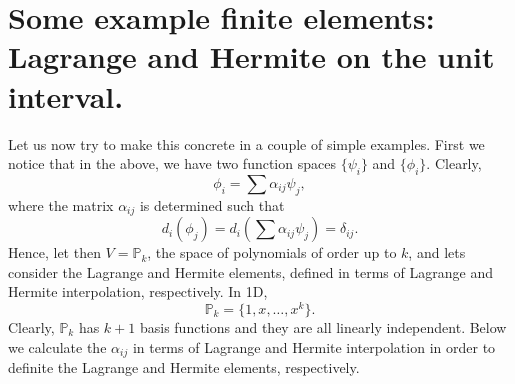 \section{Some example finite elements: Lagrange and Hermite on the unit interval. }
Let us now try to make this concrete in a couple of simple examples. First we notice that  
in the above, we have two function spaces $\{\psi_i\}$ and $\{\phi_i\}$. Clearly, 
\begin{equation}
\label{fem:abstract:nodal}
\phi_i = \sum \alpha_{ij}\psi_j,  
\end{equation}
where the matrix $\alpha_{ij}$ is determined such that 
\[
d_i(\phi_j) = d_i(\sum \alpha_{ij} \psi_j) = \delta_{ij}. 
\]
Hence, let then $V=\mathbb{P}_k$, the space of polynomials of order up to $k$,  and lets consider the Lagrange and Hermite elements, defined in terms
of Lagrange and Hermite interpolation, respectively.  
In 1D, 
\[
\mathbb{P}_k = \{1, x, \ldots, x^k\}. 
\]
Clearly, $\mathbb{P}_k$ has $k+1$ basis functions  and they are all linearly independent. 
Below we calculate the $\alpha_{ij}$ in terms of Lagrange and Hermite interpolation in 
order to definite the Lagrange and Hermite elements, respectively. 

